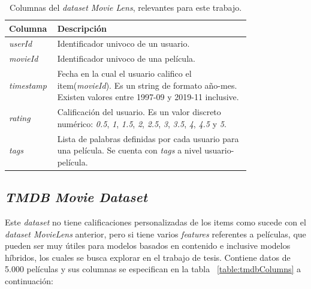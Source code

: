 \documentclass[11pt,a4paper,twoside]{thesis}
\begin{document}
\begin{table}[!htb]
	\centering
	\footnotesize
	\begin{tabular}{l | p{0.8\linewidth}}
		\hline
		Columna            & Descripción                                                                                                                                                                                 \\
		\hline
		\textit{userId}    & Identificador univoco de un usuario.                                                                                                                                                        \\
		\textit{movieId}   & Identificador univoco de una película.                                                                                                                                                      \\
		\textit{timestamp} & Fecha en la cual el usuario califico el item(\textit{movieId}). Es un string de formato año-mes. Existen valores entre 1997-09 y 2019-11 inclusive.                                         \\
		\textit{rating}    & Calificación del usuario. Es un valor discreto numérico: \textit{0.5}, \textit{1}, \textit{1.5}, \textit{2}, \textit{2.5}, \textit{3}, \textit{3.5}, \textit{4}, \textit{4.5} y \textit{5}. \\
		\textit{tags}      & Lista de palabras definidas por cada usuario para una película. Se cuenta con \textit{tags} a nivel usuario-película.                                                                       \\
		\hline
	\end{tabular}
	\caption{
		Columnas del \textit{dataset} \textit{Movie Lens}, relevantes para este trabajo.
	}
	\label{table:movieLensColumns}
\end{table}

\clearpage

\subsection{\textit{TMDB Movie Dataset}}

Este \textit{dataset} \cite{tmdb} no tiene calificaciones personalizadas de los
items como sucede con el \textit{dataset MovieLens} anterior, pero si tiene
varios \textit{features} referentes a películas, que pueden ser muy útiles para
modelos basados en contenido e inclusive modelos híbridos, los cuales se busca
explorar en el trabajo de tesis. Contiene datos de 5.000 películas y sus
columnas se especifican en la tabla ~\ref{table:tmdbColumns} a continuación:
\end{document}
